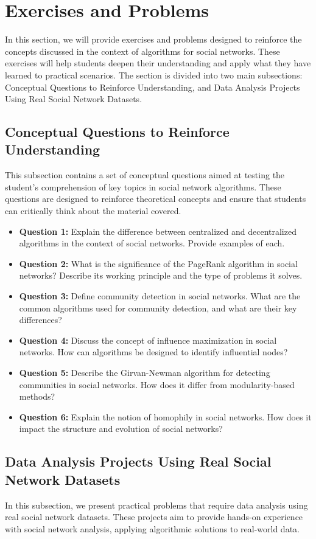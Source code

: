 \documentclass[12pt]{book} %
\begin{document}
\section{Exercises and Problems}
In this section, we will provide exercises and problems designed to reinforce the concepts discussed in the context of algorithms for social networks. These exercises will help students deepen their understanding and apply what they have learned to practical scenarios. The section is divided into two main subsections: Conceptual Questions to Reinforce Understanding, and Data Analysis Projects Using Real Social Network Datasets.

\subsection{Conceptual Questions to Reinforce Understanding}
This subsection contains a set of conceptual questions aimed at testing the student's comprehension of key topics in social network algorithms. These questions are designed to reinforce theoretical concepts and ensure that students can critically think about the material covered.

\begin{itemize}
    \item \textbf{Question 1:} Explain the difference between centralized and decentralized algorithms in the context of social networks. Provide examples of each.
    \item \textbf{Question 2:} What is the significance of the PageRank algorithm in social networks? Describe its working principle and the type of problems it solves.
    \item \textbf{Question 3:} Define community detection in social networks. What are the common algorithms used for community detection, and what are their key differences?
    \item \textbf{Question 4:} Discuss the concept of influence maximization in social networks. How can algorithms be designed to identify influential nodes?
    \item \textbf{Question 5:} Describe the Girvan-Newman algorithm for detecting communities in social networks. How does it differ from modularity-based methods?
    \item \textbf{Question 6:} Explain the notion of homophily in social networks. How does it impact the structure and evolution of social networks?
\end{itemize}

\subsection{Data Analysis Projects Using Real Social Network Datasets}
In this subsection, we present practical problems that require data analysis using real social network datasets. These projects aim to provide hands-on experience with social network analysis, applying algorithmic solutions to real-world data.
\end{document}
